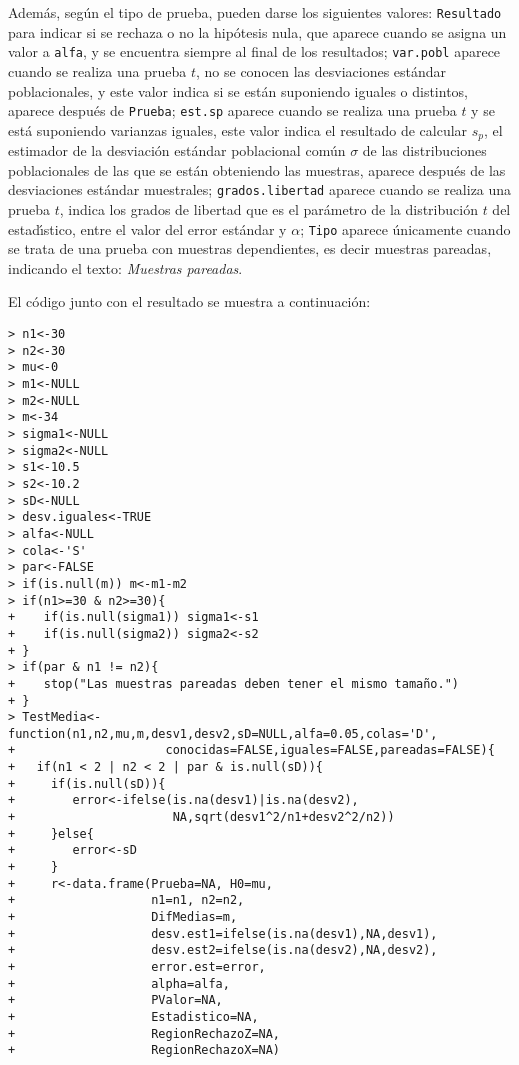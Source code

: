\begin{solucion}
 Adem\'as, seg\'un el tipo de prueba,
 pueden darse los siguientes valores:
 \texttt{Resultado} para indicar si se rechaza o no la hip\'otesis
 nula, que aparece cuando se asigna un valor a \texttt{alfa}, y se encuentra siempre al final de los resultados;
 \texttt{var.pobl} aparece cuando se realiza una prueba $t$, 
 no se conocen las desviaciones est\'andar poblacionales,
 y este valor indica si se est\'an suponiendo iguales o distintos,
 aparece despu\'es de \texttt{Prueba};
 \texttt{est.sp} aparece cuando se realiza una prueba $t$
 y se est\'a suponiendo varianzas iguales,
 este valor indica el resultado
 de calcular $s_p$, el estimador de la desviaci\'on est\'andar
 poblacional com\'un $\sigma$ de las distribuciones poblacionales
 de las que se est\'an obteniendo las muestras,
 aparece despu\'es de las desviaciones est\'andar muestrales;
 \texttt{grados.libertad} aparece cuando se realiza una prueba $t$,
 indica los grados de libertad
 que es el par\'ametro de la distribuci\'on $t$
 del estad\'{\i}stico,
 entre el valor del error est\'andar y $\alpha$;
 \texttt{Tipo} aparece \'unicamente cuando se trata de una prueba
 con muestras dependientes, es decir muestras pareadas,
 indicando el texto: \textit{Muestras pareadas}.
 \par 
 El c\'odigo junto con el resultado se muestra a continuaci\'on:
 \begin{verbatim}
> n1<-30
> n2<-30
> mu<-0
> m1<-NULL
> m2<-NULL
> m<-34
> sigma1<-NULL
> sigma2<-NULL
> s1<-10.5
> s2<-10.2
> sD<-NULL
> desv.iguales<-TRUE
> alfa<-NULL
> cola<-'S'
> par<-FALSE
> if(is.null(m)) m<-m1-m2
> if(n1>=30 & n2>=30){
+    if(is.null(sigma1)) sigma1<-s1
+    if(is.null(sigma2)) sigma2<-s2
+ }
> if(par & n1 != n2){
+    stop("Las muestras pareadas deben tener el mismo tamaño.")
+ }
> TestMedia<-function(n1,n2,mu,m,desv1,desv2,sD=NULL,alfa=0.05,colas='D',
+                     conocidas=FALSE,iguales=FALSE,pareadas=FALSE){
+   if(n1 < 2 | n2 < 2 | par & is.null(sD)){
+     if(is.null(sD)){
+        error<-ifelse(is.na(desv1)|is.na(desv2),
+                      NA,sqrt(desv1^2/n1+desv2^2/n2))
+     }else{
+        error<-sD
+     }
+     r<-data.frame(Prueba=NA, H0=mu,
+                   n1=n1, n2=n2,
+                   DifMedias=m,
+                   desv.est1=ifelse(is.na(desv1),NA,desv1),
+                   desv.est2=ifelse(is.na(desv2),NA,desv2),
+                   error.est=error,
+                   alpha=alfa,
+                   PValor=NA,
+                   Estadistico=NA,
+                   RegionRechazoZ=NA,
+                   RegionRechazoX=NA)

\end{verbatim}
\end{solucion}
